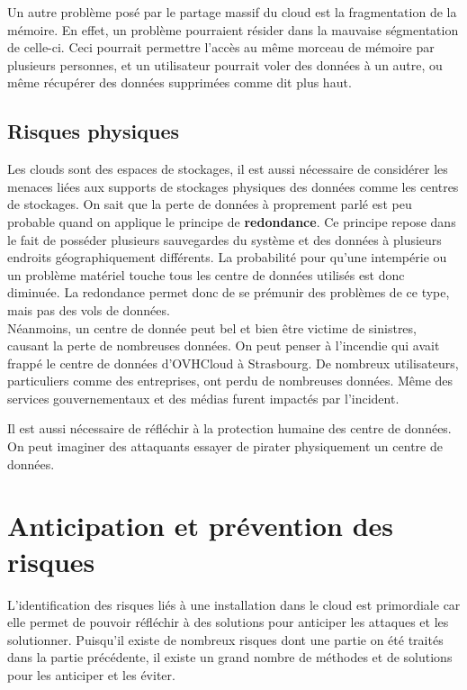 \documentclass[a4paper, 12pt]{article}
\begin{document}
      Un autre problème posé par le partage massif du cloud est la fragmentation
      de la mémoire. En effet, un problème pourraient résider dans la mauvaise
      ségmentation de celle-ci. Ceci pourrait permettre l'accès au même
      morceau de mémoire par plusieurs personnes, et un utilisateur pourrait
      voler des données à un autre, ou même récupérer des données supprimées
      comme dit plus haut.

    \subsection{Risques physiques}
      Les clouds sont des espaces de stockages, il est aussi nécessaire de
      considérer les menaces liées aux supports de stockages physiques des
      données comme les centres de stockages. On sait que la perte de données
      à proprement parlé est peu probable quand on applique le principe de
      \textbf{redondance}. Ce principe repose dans le fait de posséder plusieurs
      sauvegardes du système et des données à plusieurs endroits
      géographiquement différents. La probabilité pour qu'une intempérie ou un
      problème matériel touche tous les centre de données utilisés est donc
      diminuée. La redondance permet donc de se prémunir des problèmes de ce
      type, mais pas des vols de données. \\

      Néanmoins, un centre de donnée peut bel et bien être victime de sinistres,
      causant la perte de nombreuses données. On peut penser à l'incendie qui
      avait frappé le centre de données d'OVHCloud à Strasbourg. De nombreux
      utilisateurs, particuliers comme des entreprises, ont perdu de nombreuses
      données. Même des services gouvernementaux et des médias furent impactés
      par l'incident.

      Il est aussi nécessaire de réfléchir à la protection humaine des centre de
      données. On peut imaginer des attaquants essayer de pirater physiquement
      un centre de données.

  \section{Anticipation et prévention des risques}
      L'identification des risques liés à une installation dans le cloud est
      primordiale car elle permet de pouvoir réfléchir à des solutions pour
      anticiper les attaques et les solutionner. Puisqu'il existe de nombreux
      risques dont une partie on été traités dans la partie précédente, il
      existe un grand nombre de méthodes et de solutions pour les anticiper
      et les éviter.
\end{document}
